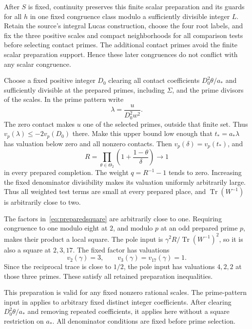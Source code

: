 \documentclass[11pt,a4paper]{article}
\DeclareMathOperator{\Tr}{Tr}\DeclareMathOperator{\Nm}{Nm}
\begin{document}
After $S$ is fixed, continuity preserves this finite scalar preparation
and its guards for all $h$ in one fixed congruence class modulo a
sufficiently divisible integer $L$. Retain the source's integral Lucas
construction, choose the four root labels, and fix the three positive scales
and compact neighborhoods for all comparison tests before selecting
contact primes. The additional contact primes avoid the finite scalar
preparation support. Hence these later congruences do not conflict with
any scalar congruence.

Choose a fixed positive integer $D_0$ clearing all contact coefficients
$D_0^2\theta/a_*$ and sufficiently divisible at the prepared primes,
including $\Sigma$, and the prime divisors of the scales. In the prime
pattern write
\[
                         \lambda=\frac{u}{D_0^2w^2}.
\]
The zero contact makes $u$ one of the selected primes, outside that
finite set. Thus $v_p(\lambda)\le-2v_p(D_0)$ there. Make this upper
bound low enough that $t_*=a_*\lambda$ has valuation below zero and
all nonzero contacts. Then $v_p(\delta)=v_p(t_*)$, and
\begin{equation}\label{eq:preparedsquare}
 R=\prod_{\theta\in\Theta_2}
                 \left(1+\frac{1-\theta}{\delta}\right)
       \longrightarrow1
\end{equation}
in every prepared completion. The weight $q=R^{-1}-1$ tends to zero.
Increasing the fixed denominator divisibility makes its valuation
uniformly arbitrarily large. Thus all weighted test terms are small
at every prepared place, and $\Tr(W^{-1})$ is arbitrarily close to two.

The factors in~\eqref{eq:preparedsquare} are arbitrarily close to one.
Requiring congruence to one modulo eight at $2$, and modulo $p$ at an odd
prepared prime $p$, makes their product a local square. The pole input
is $\gamma^2R/\Tr(W^{-1})^2$, so it is also a square at $2,3,17$.
The fixed factor has valuations
\[
 v_2(\gamma)=3,\qquad v_3(\gamma)=v_{17}(\gamma)=1.
\]
Since the reciprocal trace is close to $1/2$, the pole input has
valuations $4,2,2$ at those three primes. These satisfy all retained
preparation inequalities.

This preparation is valid for any fixed nonzero rational scales.
The prime-pattern input in \cite{Selection,Dependencies} applies to
arbitrary fixed distinct integer coefficients. After clearing
$D_0^2\theta/a_*$ and removing repeated coefficients, it applies
here without a square restriction on $a_*$. All denominator
conditions are fixed before prime selection.
\end{document}
